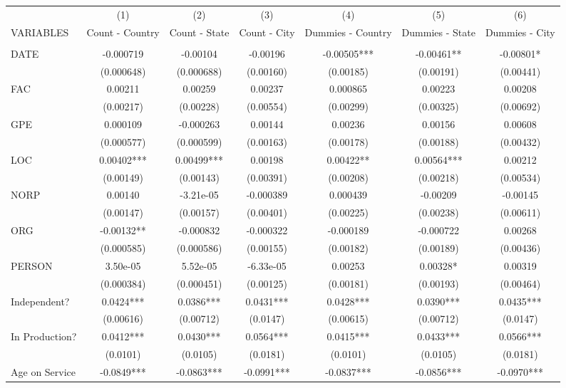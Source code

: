 \begin{tabular}{lcccccc} \hline
    & (1) & (2) & (3) & (4) & (5) & (6) \\
   VARIABLES & Count - Country & Count - State & Count - City & Dummies - Country & Dummies - State & Dummies - City \\ \hline
    &  &  &  &  &  &  \\
   DATE & -0.000719 & -0.00104 & -0.00196 & -0.00505*** & -0.00461** & -0.00801* \\
    & (0.000648) & (0.000688) & (0.00160) & (0.00185) & (0.00191) & (0.00441) \\
   FAC & 0.00211 & 0.00259 & 0.00237 & 0.000865 & 0.00223 & 0.00208 \\
    & (0.00217) & (0.00228) & (0.00554) & (0.00299) & (0.00325) & (0.00692) \\
   GPE & 0.000109 & -0.000263 & 0.00144 & 0.00236 & 0.00156 & 0.00608 \\
    & (0.000577) & (0.000599) & (0.00163) & (0.00178) & (0.00188) & (0.00432) \\
   LOC & 0.00402*** & 0.00499*** & 0.00198 & 0.00422** & 0.00564*** & 0.00212 \\
    & (0.00149) & (0.00143) & (0.00391) & (0.00208) & (0.00218) & (0.00534) \\
   NORP & 0.00140 & -3.21e-05 & -0.000389 &  0.000439 & -0.00209 & -0.00145 \\
    & (0.00147) & (0.00157) & (0.00401) &  (0.00225) & (0.00238) & (0.00611) \\
   ORG & -0.00132** & -0.000832 & -0.000322 & -0.000189 & -0.000722 & 0.00268 \\
    & (0.000585) & (0.000586) & (0.00155) & (0.00182) & (0.00189) & (0.00436) \\
   PERSON & 3.50e-05 & 5.52e-05 & -6.33e-05 & 0.00253 & 0.00328* & 0.00319  \\
    & (0.000384) & (0.000451) & (0.00125) & (0.00181) & (0.00193) & (0.00464) \\
   Independent? & 0.0424*** & 0.0386*** & 0.0431*** & 0.0428*** & 0.0390*** & 0.0435*** \\
    & (0.00616) & (0.00712) & (0.0147) & (0.00615) & (0.00712) & (0.0147) \\
   In Production? & 0.0412*** & 0.0430*** & 0.0564*** & 0.0415*** & 0.0433*** & 0.0566*** \\
    & (0.0101) & (0.0105) & (0.0181) & (0.0101) & (0.0105) & (0.0181) \\
   Age on Service & -0.0849*** & -0.0863*** & -0.0991*** & -0.0837*** & -0.0856*** & -0.0970*** \\

\end{tabular}
